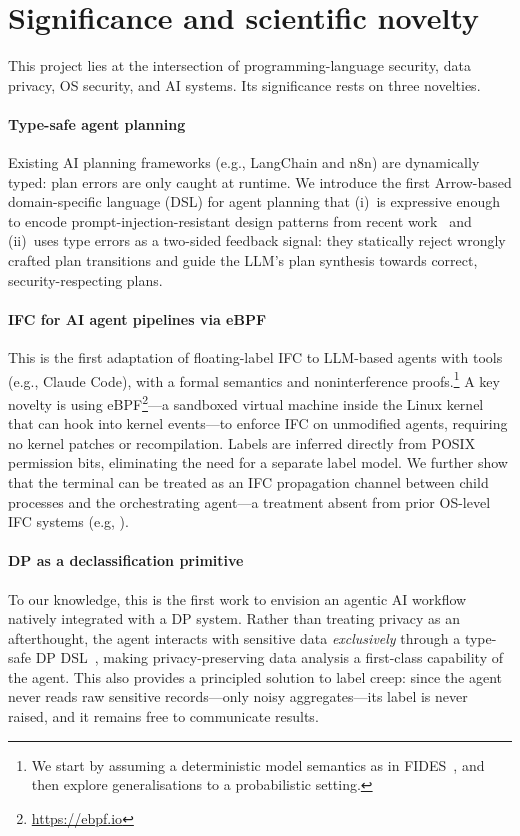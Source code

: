 \documentclass{kaw}
\begin{document}
\section{Significance and scientific novelty}
\label{sec:novelty}

This project lies at the intersection of
programming-language security, data privacy, OS security, and AI systems.
%
Its significance rests on three novelties.

\paragraph{Type-safe agent planning}
Existing AI planning frameworks (e.g., LangChain and n8n) are dynamically typed:
plan errors are only caught at runtime.
%
We introduce the first Arrow-based domain-specific language (DSL) for agent
planning that (i)~is expressive enough to encode prompt-injection-resistant
design patterns from recent work~\cite{BeurerKellner:Patterns25} and (ii)~uses type errors
as a two-sided feedback signal: they statically reject wrongly crafted plan
transitions and guide the LLM's plan synthesis towards correct,
security-respecting plans.
%

\paragraph{IFC for AI agent pipelines via eBPF}
This is the first adaptation of floating-label IFC to LLM-based agents with
tools (e.g., Claude Code), with a formal semantics and
noninterference proofs.\footnote{We start by assuming a deterministic model
semantics as in FIDES~\cite{Costa:FIDES25}, and then explore generalisations
to a probabilistic setting.}
%
A key novelty is using eBPF\footnote{\url{https://ebpf.io}}---a sandboxed virtual machine
inside the Linux kernel that can hook into kernel events---to
enforce IFC on unmodified agents, requiring no kernel patches or recompilation.
%
Labels are inferred directly from POSIX permission bits, eliminating the need
for a separate label model.
%
We further show that the terminal can be treated as an IFC propagation channel
between child processes and the orchestrating agent---a treatment absent from
prior OS-level IFC systems (e.g, \cite{zeldovich:histar,vandebogart:asbestos-tocs,krohn:flume}).

\paragraph{DP as a declassification primitive}
To our knowledge, this is the first work to envision an agentic AI workflow
natively integrated with a DP system.
%
Rather than treating privacy as an afterthought, the agent interacts with
sensitive data \emph{exclusively} through a type-safe DP
DSL~\cite{LoboVesga:SP20,LoboVesga:OOPSLA24}, making privacy-preserving
data analysis a first-class capability of the agent.
%
This also provides a principled solution to label creep: since the agent never
reads raw sensitive records---only noisy aggregates---its label is never raised,
and it remains free to communicate results.
\end{document}
